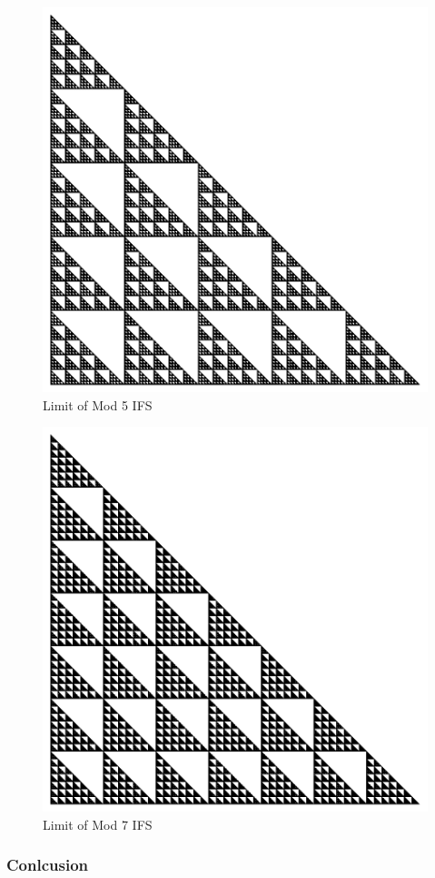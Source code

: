 \documentclass{beamer}
\begin{document}
\begin{frame}
    \begin{figure}
        \centering
        \includegraphics[scale=0.5]{GlobalMod5}
        \caption{Limit of Mod 5 IFS}
    \end{figure}
\end{frame}

\begin{frame}
    \begin{figure}
        \centering
        \includegraphics[scale=0.5]{GlobalMod7}
        \caption{Limit of Mod 7 IFS}
    \end{figure}
\end{frame}

\begin{frame}
    \frametitle{Conlcusion}
    \begin{enumerate}
        
    \end{enumerate}
        
\end{frame}
\end{document}
